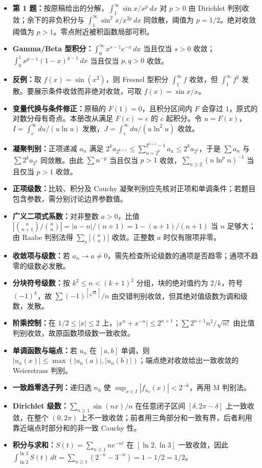 \begin{itemize}
\item \textbf{第 1 题：}按原稿给出的分解，$\int_1^\infty\sin x/x^p\,dx$ 对 $p>0$ 由 Dirichlet 判别收敛；余下的非负积分与 $\int_1^\infty\sin^2x/x^{2p}\,dx$ 同敛散，阈值为 $p=1/2$。绝对收敛阈值为 $p>1$。零点附近被积函数局部可积。
\item \textbf{Gamma/Beta 型积分：}$\int_0^\infty x^{s-1}e^{-x}\,dx$ 当且仅当 $s>0$ 收敛；$\int_0^1x^{p-1}(1-x)^{q-1}\,dx$ 当且仅当 $p,q>0$ 收敛。
\item \textbf{反例：}取 $f(x)=\sin(x^2)$，则 Fresnel 型积分 $\int_1^\infty f$ 收敛，但 $\int_1^\infty f^2$ 发散。要展示条件收敛而非绝对收敛，可取 $f(x)=\sin x/x$。
\item \textbf{变量代换与条件修正：}原稿的 $F(1)=0$，且积分区间内 $F$ 会穿过 $1$，原式的对数分母有奇点。本册改从满足 $F(c)=e$ 的 $c$ 起积分。令 $u=F(x)$，$I=\int_e^\infty du/(u\ln u)$ 发散，$J=\int_e^\infty du/(u\ln^2u)$ 收敛。
\item \textbf{凝聚判别：}正项递减 $a_n$ 满足 $2^ka_{2^{k+1}}\le\sum_{n=2^k}^{2^{k+1}-1}a_n\le2^ka_{2^k}$，于是 $\sum a_n$ 与 $\sum2^ka_{2^k}$ 同敛散。由此 $\sum n^{-p}$ 当且仅当 $p>1$ 收敛，$\sum_{n\ge2}(n\ln^p n)^{-1}$ 当且仅当 $p>1$ 收敛。
\end{itemize}

\begin{itemize}
\item \textbf{正项级数：}比较、积分及 Cauchy 凝聚判别应先核对正项和单调条件；若题目包含参数，需分别讨论边界参数值。
\item \textbf{广义二项式系数：}对非整数 $a>0$，比值 $|\binom a{n+1}/\binom a n|=|a-n|/(n+1)=1-(a+1)/(n+1)$ 当 $n$ 足够大；由 Raabe 判别法得 $\sum_n|\binom a n|$ 收敛。正整数 $a$ 时仅有限项非零。
\item \textbf{收敛项与级数：}若 $a_n\to a\ne0$，需先检查所论级数的通项是否趋零；通项不趋零的级数必发散。
\item \textbf{分块符号级数：}按 $k^2\le n<(k+1)^2$ 分组，块的绝对值约为 $2/k$，符号 $(-1)^k$，故 $\sum(-1)^{[\sqrt n]}/n$ 由交错判别收敛，但其绝对值级数为调和级数，发散。
\end{itemize}

\begin{itemize}
\item \textbf{阶乘控制：}在 $1/2\le|x|\le2$ 上，$|x^n+x^{-n}|\le2^{n+1}$；$\sum 2^{n+1}n^2/\sqrt{n!}$ 由比值判别收敛，故原函数项级数一致收敛。
\item \textbf{单调函数与端点：}若 $u_n$ 在 $[a,b]$ 单调，则 $|u_n(x)|\le\max(|u_n(a)|,|u_n(b)|)$；端点绝对收敛给出一致收敛的 Weierstrass 判别。
\item \textbf{一致趋零选子列：}递归选 $n_k$ 使 $\sup_{x\in I}|f_{n_k}(x)|<2^{-k}$，再用 M 判别法。
\item \textbf{Dirichlet 级数：}$\sum_{n\ge1}\sin(nx)/n$ 在任意闭子区间 $[\delta,2\pi-\delta]$ 上一致收敛，在整个 $(0,2\pi)$ 上不一致收敛；前者用三角部分和一致有界，后者利用靠近端点时部分和的非一致 Cauchy 性。
\item \textbf{积分与求和：}$S(t)=\sum_{n\ge1}ne^{-nt}$ 在 $[\ln2,\ln3]$ 一致收敛，因此 $\int_{\ln2}^{\ln3}S(t)\,dt=\sum_{n\ge1}(2^{-n}-3^{-n})=1-1/2=1/2$。
\end{itemize}
